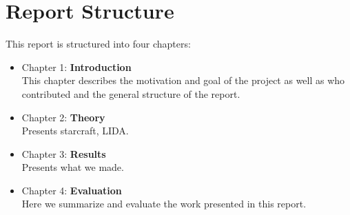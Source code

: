 \section{Report Structure}
\label{sec:structure}
This report is structured into four chapters:
\begin{itemize}
\item Chapter 1: \textbf{Introduction} \\
This chapter describes the motivation and goal of the project as well as who
contributed and the general structure of the report.
\item Chapter 2: \textbf{Theory} \\
Presents starcraft, LIDA.
\item Chapter 3: \textbf{Results} \\
Presents what we made.
\item Chapter 4: \textbf{Evaluation} \\
Here we summarize and evaluate the work presented in this report.

\end{itemize}